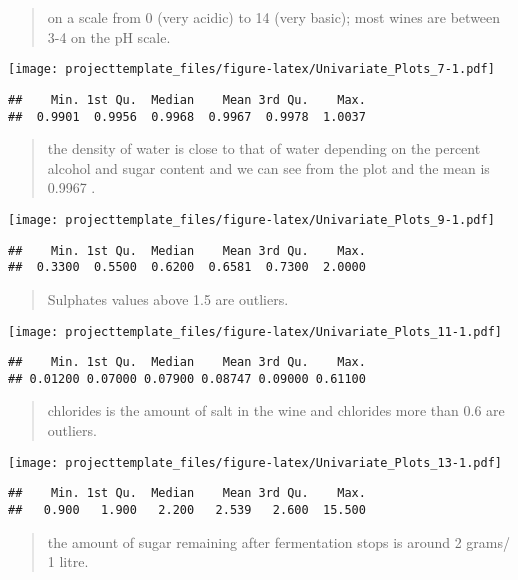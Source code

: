 \documentclass[]{article}
\begin{document}
\begin{quote}
on a scale from 0 (very acidic) to 14 (very basic); most wines are
between 3-4 on the pH scale.
\end{quote}

\texttt{[image: projecttemplate\_files/figure-latex/Univariate\_Plots\_7-1.pdf]}

\begin{verbatim}
##    Min. 1st Qu.  Median    Mean 3rd Qu.    Max. 
##  0.9901  0.9956  0.9968  0.9967  0.9978  1.0037
\end{verbatim}

\begin{quote}
the density of water is close to that of water depending on the percent
alcohol and sugar content and we can see from the plot and the mean is
0.9967 .
\end{quote}

\texttt{[image: projecttemplate\_files/figure-latex/Univariate\_Plots\_9-1.pdf]}

\begin{verbatim}
##    Min. 1st Qu.  Median    Mean 3rd Qu.    Max. 
##  0.3300  0.5500  0.6200  0.6581  0.7300  2.0000
\end{verbatim}

\begin{quote}
Sulphates values above 1.5 are outliers.
\end{quote}

\texttt{[image: projecttemplate\_files/figure-latex/Univariate\_Plots\_11-1.pdf]}

\begin{verbatim}
##    Min. 1st Qu.  Median    Mean 3rd Qu.    Max. 
## 0.01200 0.07000 0.07900 0.08747 0.09000 0.61100
\end{verbatim}

\begin{quote}
chlorides is the amount of salt in the wine and chlorides more than 0.6
are outliers.
\end{quote}

\texttt{[image: projecttemplate\_files/figure-latex/Univariate\_Plots\_13-1.pdf]}

\begin{verbatim}
##    Min. 1st Qu.  Median    Mean 3rd Qu.    Max. 
##   0.900   1.900   2.200   2.539   2.600  15.500
\end{verbatim}

\begin{quote}
the amount of sugar remaining after fermentation stops is around 2
grams/ 1 litre.
\end{quote}
\end{document}
